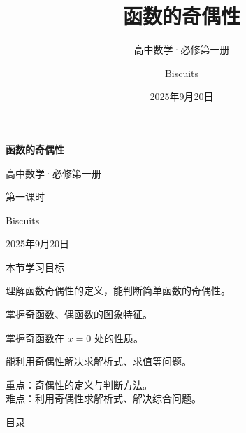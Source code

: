 \documentclass[aspectratio=169,11pt]{biscuitsbeamer}
\title{函数的奇偶性}
\subtitle{高中数学·必修第一册}
\author{Biscuits}
\date{2025年9月20日}
\begin{document}
{
	\begin{frame}
		\TitlePageArtwork
		\vspace*{1.6cm}
		\hspace*{1.25cm}
		\begin{minipage}[t]{0.50\paperwidth}
			\vspace{0.5cm}
			{\color{PrimaryGreen}\bfseries\fontsize{24}{30}\selectfont 函数的奇偶性\par}
			\vspace{0.2cm}
			{\color{WarmGray}\Large 高中数学·必修第一册\par}
			\vspace{0.2cm}
			{\color{WarmGray}\normalsize 第一课时\par}
			\vspace{0.55cm}
			{\Large Biscuits\par}
			\vspace{0.2cm}
			{\large 2025年9月20日\par}
		\end{minipage}
	\end{frame}
}
\begin{frame}{本节学习目标}
	\begin{quan}
		\item 理解函数奇偶性的定义，能判断简单函数的奇偶性。
		\item 掌握奇函数、偶函数的图象特征。
		\item 掌握奇函数在 $x=0$ 处的性质。
		\item 能利用奇偶性解决求解析式、求值等问题。
	\end{quan}
	\vspace{3mm}
	\begin{tip}
		重点：奇偶性的定义与判断方法。\\
		难点：利用奇偶性求解析式、解决综合问题。
	\end{tip}
\end{frame}

\begin{frame}[allowdisplaybreaks]{目录}
	\tableofcontents
\end{frame}








\end{document}
